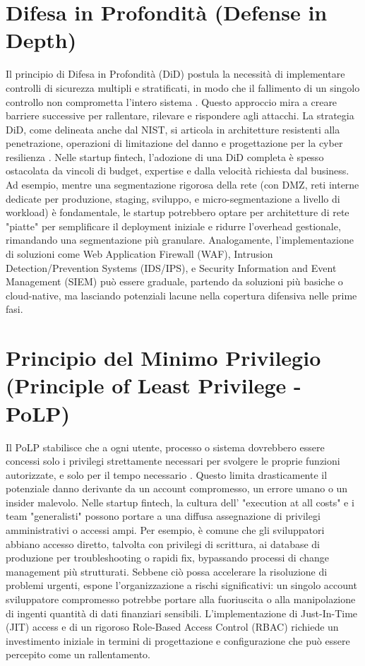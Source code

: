 \section{Difesa in Profondità (Defense in Depth)}
Il principio di Difesa in Profondità (DiD) postula la necessità di implementare controlli di sicurezza multipli e stratificati, in modo che il fallimento di un singolo controllo non comprometta l'intero sistema \cite{NIST_SP_800_53}. Questo approccio mira a creare barriere successive per rallentare, rilevare e rispondere agli attacchi. La strategia DiD, come delineata anche dal NIST, si articola in architetture resistenti alla penetrazione, operazioni di limitazione del danno e progettazione per la cyber resilienza \cite{NIST_SP_800_172}.
Nelle startup fintech, l'adozione di una DiD completa è spesso ostacolata da vincoli di budget, expertise e dalla velocità richiesta dal business. Ad esempio, mentre una segmentazione rigorosa della rete (con DMZ, reti interne dedicate per produzione, staging, sviluppo, e micro-segmentazione a livello di workload) è fondamentale, le startup potrebbero optare per architetture di rete "piatte" per semplificare il deployment iniziale e ridurre l'overhead gestionale, rimandando una segmentazione più granulare. Analogamente, l'implementazione di soluzioni come Web Application Firewall (WAF), Intrusion Detection/Prevention Systems (IDS/IPS), e Security Information and Event Management (SIEM) può essere graduale, partendo da soluzioni più basiche o cloud-native, ma lasciando potenziali lacune nella copertura difensiva nelle prime fasi.
\section{Principio del Minimo Privilegio (Principle of Least Privilege - PoLP)}
Il PoLP stabilisce che a ogni utente, processo o sistema dovrebbero essere concessi solo i privilegi strettamente necessari per svolgere le proprie funzioni autorizzate, e solo per il tempo necessario \cite{NIST_Glossary}. Questo limita drasticamente il potenziale danno derivante da un account compromesso, un errore umano o un insider malevolo.
Nelle startup fintech, la cultura dell' "execution at all costs" e i team "generalisti" possono portare a una diffusa assegnazione di privilegi amministrativi o accessi ampi. Per esempio, è comune che gli sviluppatori abbiano accesso diretto, talvolta con privilegi di scrittura, ai database di produzione per troubleshooting o rapidi fix, bypassando processi di change management più strutturati. Sebbene ciò possa accelerare la risoluzione di problemi urgenti, espone l'organizzazione a rischi significativi: un singolo account sviluppatore compromesso potrebbe portare alla fuoriuscita o alla manipolazione di ingenti quantità di dati finanziari sensibili. L'implementazione di Just-In-Time (JIT) access e di un rigoroso Role-Based Access Control (RBAC) richiede un investimento iniziale in termini di progettazione e configurazione che può essere percepito come un rallentamento.
